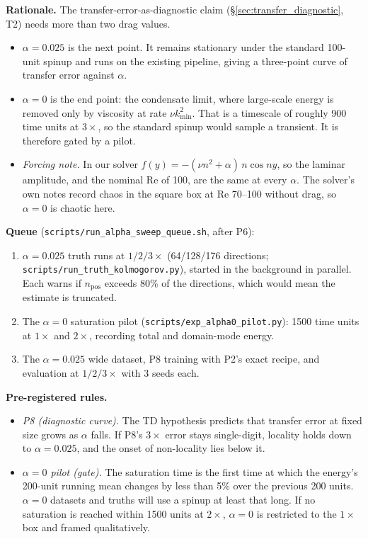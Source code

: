 \documentclass[11pt]{article}
\begin{document}
\textbf{Rationale.} The transfer-error-as-diagnostic claim
(\S\ref{sec:transfer_diagnostic}, T2) needs more than two drag values.
\begin{itemize}[leftmargin=*]
\item \emph{$\alpha{=}0.025$} is the next point. It remains stationary
  under the standard 100-unit spinup and runs on the existing pipeline,
  giving a three-point curve of transfer error against $\alpha$.
\item \emph{$\alpha{=}0$} is the end point: the condensate limit, where
  large-scale energy is removed only by viscosity at rate
  $\nu k_{\min}^2$. That is a timescale of roughly 900 time units at
  $3\times$, so the standard spinup would sample a transient. It is
  therefore gated by a pilot.
\item \emph{Forcing note.} In our solver
  $f(y)=-(\nu n^2+\alpha)\,n\cos ny$, so the laminar amplitude, and the
  nominal Re of 100, are the same at every $\alpha$. The solver's own
  notes record chaos in the square box at Re 70--100 without drag, so
  $\alpha{=}0$ is chaotic here.
\end{itemize}

\textbf{Queue} (\texttt{scripts/run\_alpha\_sweep\_queue.sh}, after P6):
\begin{enumerate}[leftmargin=*]
\item $\alpha{=}0.025$ truth runs at $1/2/3\times$ (64/128/176
  directions; \texttt{scripts/run\_truth\_kolmogorov.py}), started in the
  background in parallel. Each warns if $n_{\mathrm{pos}}$ exceeds 80\%
  of the directions, which would mean the estimate is truncated.
\item The $\alpha{=}0$ saturation pilot (\texttt{scripts/exp\_alpha0\_pilot.py}):
  1500 time units at $1\times$ and $2\times$, recording total and
  domain-mode energy.
\item The $\alpha{=}0.025$ wide dataset, P8 training with P2's exact
  recipe, and evaluation at $1/2/3\times$ with 3 seeds each.
\end{enumerate}

\textbf{Pre-registered rules.}
\begin{itemize}[leftmargin=*]
\item \emph{P8 (diagnostic curve).} The TD hypothesis predicts that
  transfer error at fixed size grows as $\alpha$ falls. If P8's $3\times$
  error stays single-digit, locality holds down to $\alpha{=}0.025$, and
  the onset of non-locality lies below it.
\item \emph{$\alpha{=}0$ pilot (gate).} The saturation time is the
  first time at which the energy's 200-unit running mean changes by less
  than 5\% over the previous 200 units. $\alpha{=}0$ datasets and truths
  will use a spinup at least that long. If no saturation is reached
  within 1500 units at $2\times$, $\alpha{=}0$ is restricted to the
  $1\times$ box and framed qualitatively.
\end{itemize}
\end{document}
